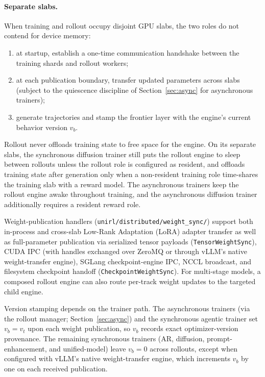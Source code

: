 \documentclass[10pt]{article}
\newcommand{\codepath}[1]{\texttt{#1}}
\begin{document}
\paragraph{Separate slabs.}
When training and rollout occupy disjoint GPU slabs, the two roles do not contend for device memory:
\begin{enumerate}
  \item at startup, establish a one-time communication handshake between the training shards and rollout workers;
  \item at each publication boundary, transfer updated parameters across slabs (subject to the quiescence discipline of Section~\ref{sec:async} for asynchronous trainers);
  \item generate trajectories and stamp the frontier layer with the engine's current behavior version $v_b$.
\end{enumerate}
Rollout never offloads training state to free space for the engine.
On its separate slabs, the synchronous diffusion trainer still puts the rollout engine to sleep between rollouts unless the rollout role is configured as resident, and offloads training state after generation only when a non-resident training role time-shares the training slab with a reward model.
The asynchronous trainers keep the rollout engine awake throughout training, and the asynchronous diffusion trainer additionally requires a resident reward role.

Weight-publication handlers (\codepath{unirl/distributed/weight\_sync/}) support both in-process and cross-slab Low-Rank Adaptation (LoRA) adapter transfer as well as full-parameter publication via serialized tensor payloads (\texttt{TensorWeightSync}), CUDA IPC (with handles exchanged over ZeroMQ or through vLLM's native weight-transfer engine), SGLang checkpoint-engine IPC, NCCL broadcast, and filesystem checkpoint handoff (\texttt{CheckpointWeightSync}).
For multi-stage models, a composed rollout engine can also route per-track weight updates to the targeted child engine.

Version stamping depends on the trainer path.
The asynchronous trainers (via the rollout manager; Section~\ref{sec:async}) and the synchronous agentic trainer set $v_b = v_t$ upon each weight publication, so $v_b$ records exact optimizer-version provenance.
The remaining synchronous trainers (AR, diffusion, prompt-enhancement, and unified-model) leave $v_b = 0$ across rollouts, except when configured with vLLM's native weight-transfer engine, which increments $v_b$ by one on each received publication.
\end{document}
